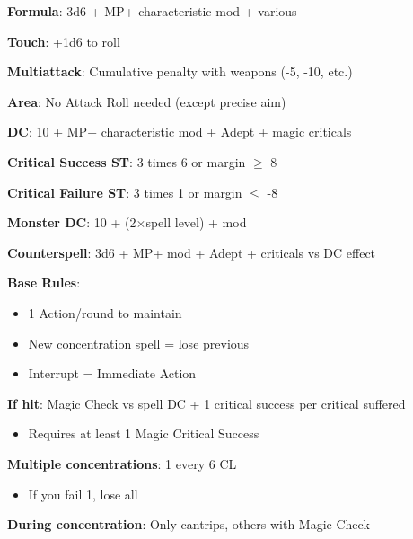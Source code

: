 \documentclass[10pt,a4paper,landscape]{article}
\begin{document}
\begin{multicols}{3}
		\begin{tcolorbox}[title=SPELL ATTACK ROLLS]
			\textbf{Formula}: 3d6 + MP+ characteristic mod + various
			
			\textbf{Touch}: +1d6 to roll
			
			\textbf{Multiattack}: Cumulative penalty with weapons (-5, -10, etc.)
			
			\textbf{Area}: No Attack Roll needed (except precise aim)
		\end{tcolorbox}
		
		\begin{tcolorbox}[title=SPELL SAVING THROWS]
			\textbf{DC}: 10 + MP+ characteristic mod + Adept + magic criticals
			
			\textcolor{successcolor}{\textbf{Critical Success ST}}: 3 times 6 or margin $\geq$ 8
			
			\textcolor{criticalcolor}{\textbf{Critical Failure ST}}: 3 times 1 or margin $\leq$ -8
			
			\textbf{Monster DC}: 10 + (2$\times$spell level) + mod
			
			\textbf{Counterspell}: 3d6 + MP+ mod + Adept + criticals vs DC effect
		\end{tcolorbox}
		
		\begin{tcolorbox}[title=CONCENTRATION]
			\textbf{Base Rules}:
			\begin{itemize}[leftmargin=*,noitemsep]
				\item 1 Action/round to maintain
				\item New concentration spell = lose previous
				\item Interrupt = Immediate Action
			\end{itemize}
			
			\textbf{If hit}: Magic Check vs spell DC + 1 critical success per critical suffered
			\begin{itemize}[leftmargin=*,noitemsep]
				\item Requires at least 1 Magic Critical Success
			\end{itemize}
			
			\textbf{Multiple concentrations}: 1 every 6 CL
			\begin{itemize}[leftmargin=*,noitemsep]
				\item If you fail 1, lose all
			\end{itemize}
			
			\textbf{During concentration}: Only cantrips, others with Magic Check
		\end{tcolorbox}
		

\end{multicols}
\end{document}
